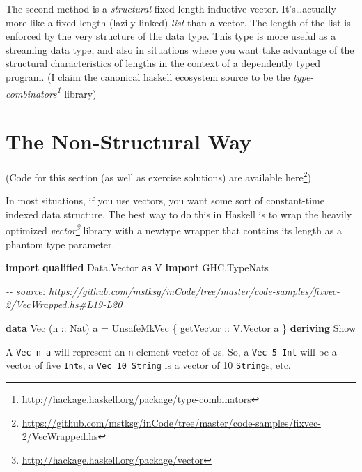 \documentclass[]{article}
\newenvironment{Shaded}{}{}
\newcommand{\CommentTok}[1]{\textcolor[rgb]{0.38,0.63,0.69}{\textit{#1}}}
\newcommand{\DataTypeTok}[1]{\textcolor[rgb]{0.56,0.13,0.00}{#1}}
\newcommand{\KeywordTok}[1]{\textcolor[rgb]{0.00,0.44,0.13}{\textbf{#1}}}
\newcommand{\NormalTok}[1]{#1}
\newcommand{\OtherTok}[1]{\textcolor[rgb]{0.00,0.44,0.13}{#1}}
\renewcommand{\href}[2]{#2\footnote{\url{#1}}}
\begin{document}
The second method is a \emph{structural} fixed-length inductive vector.
It's\ldots actually more like a fixed-length (lazily linked) \emph{list} than a
vector. The length of the list is enforced by the very structure of the data
type. This type is more useful as a streaming data type, and also in situations
where you want take advantage of the structural characteristics of lengths in
the context of a dependently typed program. (I claim the canonical haskell
ecosystem source to be the
\emph{\href{http://hackage.haskell.org/package/type-combinators}{type-combinators}}
library)

\section{The Non-Structural Way}\label{the-non-structural-way}

(Code for this section (as well as exercise solutions) are
\href{https://github.com/mstksg/inCode/tree/master/code-samples/fixvec-2/VecWrapped.hs}{available
here})

In most situations, if you use vectors, you want some sort of constant-time
indexed data structure. The best way to do this in Haskell is to wrap the
heavily optimized
\emph{\href{http://hackage.haskell.org/package/vector}{vector}} library with a
newtype wrapper that contains its length as a phantom type parameter.

\begin{Shaded}
\begin{Highlighting}[]
\KeywordTok{import} \KeywordTok{qualified} \DataTypeTok{Data.Vector} \KeywordTok{as} \DataTypeTok{V}
\KeywordTok{import}           \DataTypeTok{GHC.TypeNats}

\CommentTok{{-}{-} source: https://github.com/mstksg/inCode/tree/master/code{-}samples/fixvec{-}2/VecWrapped.hs\#L19{-}L20}

\KeywordTok{data} \DataTypeTok{Vec}\NormalTok{ (}\OtherTok{n ::} \DataTypeTok{Nat}\NormalTok{) a }\OtherTok{=} \DataTypeTok{UnsafeMkVec}\NormalTok{ \{}\OtherTok{ getVector ::} \DataTypeTok{V.Vector}\NormalTok{ a \}}
    \KeywordTok{deriving} \DataTypeTok{Show}
\end{Highlighting}
\end{Shaded}

A \texttt{Vec\ n\ a} will represent an \texttt{n}-element vector of \texttt{a}s.
So, a \texttt{Vec\ 5\ Int} will be a vector of five \texttt{Int}s, a
\texttt{Vec\ 10\ String} is a vector of 10 \texttt{String}s, etc.
\end{document}

